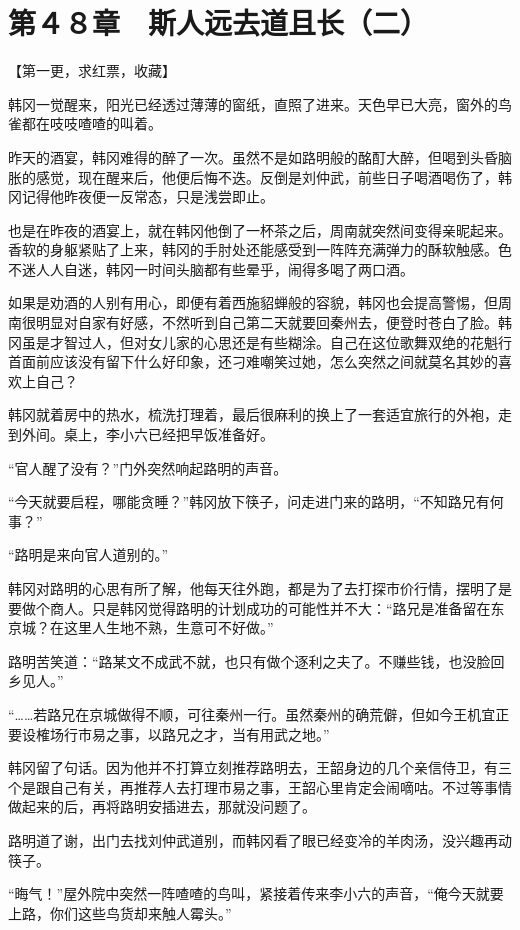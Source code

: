 \section{第４８章　斯人远去道且长（二）}

【第一更，求红票，收藏】

韩冈一觉醒来，阳光已经透过薄薄的窗纸，直照了进来。天色早已大亮，窗外的鸟雀都在吱吱喳喳的叫着。

昨天的酒宴，韩冈难得的醉了一次。虽然不是如路明般的酩酊大醉，但喝到头昏脑胀的感觉，现在醒来后，他便后悔不迭。反倒是刘仲武，前些日子喝酒喝伤了，韩冈记得他昨夜便一反常态，只是浅尝即止。

也是在昨夜的酒宴上，就在韩冈他倒了一杯茶之后，周南就突然间变得亲昵起来。香软的身躯紧贴了上来，韩冈的手肘处还能感受到一阵阵充满弹力的酥软触感。色不迷人人自迷，韩冈一时间头脑都有些晕乎，闹得多喝了两口酒。

如果是劝酒的人别有用心，即便有着西施貂蝉般的容貌，韩冈也会提高警惕，但周南很明显对自家有好感，不然听到自己第二天就要回秦州去，便登时苍白了脸。韩冈虽是才智过人，但对女儿家的心思还是有些糊涂。自己在这位歌舞双绝的花魁行首面前应该没有留下什么好印象，还刁难嘲笑过她，怎么突然之间就莫名其妙的喜欢上自己？

韩冈就着房中的热水，梳洗打理着，最后很麻利的换上了一套适宜旅行的外袍，走到外间。桌上，李小六已经把早饭准备好。

“官人醒了没有？”门外突然响起路明的声音。

“今天就要启程，哪能贪睡？”韩冈放下筷子，问走进门来的路明，“不知路兄有何事？”

“路明是来向官人道别的。”

韩冈对路明的心思有所了解，他每天往外跑，都是为了去打探市价行情，摆明了是要做个商人。只是韩冈觉得路明的计划成功的可能性并不大：“路兄是准备留在东京城？在这里人生地不熟，生意可不好做。”

路明苦笑道：“路某文不成武不就，也只有做个逐利之夫了。不赚些钱，也没脸回乡见人。”

“……若路兄在京城做得不顺，可往秦州一行。虽然秦州的确荒僻，但如今王机宜正要设榷场行市易之事，以路兄之才，当有用武之地。”

韩冈留了句话。因为他并不打算立刻推荐路明去，王韶身边的几个亲信侍卫，有三个是跟自己有关，再推荐人去打理市易之事，王韶心里肯定会闹嘀咕。不过等事情做起来的后，再将路明安插进去，那就没问题了。

路明道了谢，出门去找刘仲武道别，而韩冈看了眼已经变冷的羊肉汤，没兴趣再动筷子。

“晦气！”屋外院中突然一阵喳喳的鸟叫，紧接着传来李小六的声音，“俺今天就要上路，你们这些鸟货却来触人霉头。”

